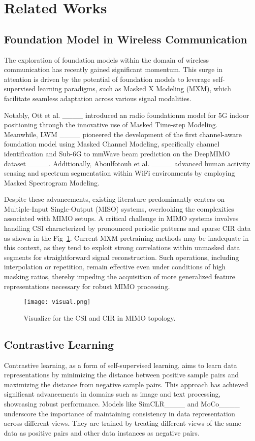 \section{Related Works}
\label{sec:related works}

\subsection{Foundation Model in Wireless Communication}
The exploration of foundation models within the domain of wireless communication has recently gained significant momentum. This surge in attention is driven by the potential of foundation models to leverage self-supervised learning paradigms, such as Masked X Modeling (MXM), which facilitate seamless adaptation across various signal modalities.

Notably, Ott et al. ____ introduced an radio foundationm model for 5G indoor positioning through the innovative use of Masked Time-step Modeling. Meanwhile, LWM ____ pioneered the development of the first channel-aware foundation model using Masked Channel Modeling, specifically channel identification and Sub-6G to mmWave beam prediction on the DeepMIMO dataset ____. Additionally, Aboulfotouh et al. ____ advanced human activity sensing and spectrum segmentation within WiFi environments by employing Masked Spectrogram Modeling.

Despite these advancements, existing literature predominantly centers on Multiple-Input Single-Output (MISO) systems, overlooking the complexities associated with MIMO setups. A critical challenge in MIMO systems involves handling CSI characterized by pronounced periodic patterns and sparse CIR data as shown in the Fig~\ref{fig:visual}. Current MXM pretraining methods may be inadequate in this context, as they tend to exploit strong correlations within unmasked data segments for straightforward signal reconstruction. Such operations, including interpolation or repetition, remain effective even under conditions of high masking ratios, thereby impeding the acquisition of more generalized feature representations necessary for robust MIMO processing.

\begin{figure}[t]
\centering\texttt{[image: visual.png]}
\caption{Visualize for the CSI and CIR in MIMO topology.}
\label{fig:visual}
\end{figure}




\subsection{Contrastive Learning}
Contrastive learning, as a form of self-supervised learning, aims to learn data representations by minimizing the distance between positive sample pairs and maximizing the distance from negative sample pairs. This approach has achieved significant advancements in domains such as image and text processing, showcasing robust performance. Models like SimCLR____ and MoCo____ underscore the importance of maintaining consistency in data representation across different views. They are trained by treating different views of the same data as positive pairs and other data instances as negative pairs.


